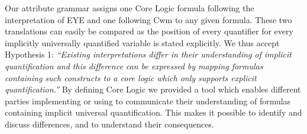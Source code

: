 Our attribute grammar assigns one \nthree Core Logic formula following the interpretation of EYE and one following Cwm  
to any given \nthree formula.  These two translations can easily be compared as the position of every quantifier for every
implicitly universally quantified variable is stated explicitly.
We thus accept Hypothesis 1: 
\emph{``Existing interpretations differ in their understanding of implicit quantification and this difference can be 
expressed by mapping formulas containing such constructs to a core logic which only supports explicit quantification.''
} By defining \nthree Core Logic we provided a tool which enables different parties implementing or using \nthreelogic to communicate their
understanding of formulas containing implicit universal quantification. %
This makes it possible to identify and discuss differences, and to understand their consequences. %
 

